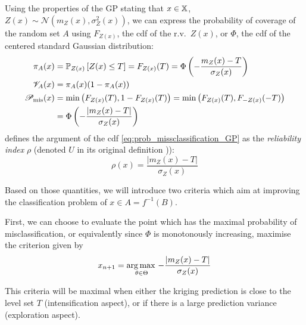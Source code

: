 \documentclass[../../Main_ManuscritThese.tex]{subfiles}
\begin{document}
Using the properties of the GP stating that $x\in\mathbb{X}$,
$Z(x)\sim\mathcal{N}\left(m_Z(x), \sigma^2_Z(x)\right)$,
we can express the probability of
coverage of the random set $A$ using $F_{Z(x)}$, the cdf of the r.v.\
$Z(x)$, or $\Phi$, the cdf of the centered standard Gaussian
distribution:
\begin{align}
  \pi_A(x) &= \mathbb{P}_{Z(x)}\left[Z(x) \leq T\right] = F_{Z(x)}(T)=\Phi\left(-\frac{m_Z(x) - T}{\sigma_Z(x)}\right) \\
  \mathscr{V}_A(x) &= \pi_A(x)(1 - \pi_A(x)) \\
  \mathscr{P}_{\mathrm{mis}}(x) &= \min\left(F_{Z(x)}(T), 1-F_{Z(x)}(T)\right)=\min\left(F_{Z(x)}(T),F_{-Z(x)}(-T)\right) \\
           &= \Phi\left(- \frac{\lvert m_Z(x) - T \rvert}{\sigma_Z(x)} \right) \label{eq:prob_missclassification_GP}
\end{align}
\cite{echard_ak-mcs_2011} defines the argument of the cdf
\cref{eq:prob_missclassification_GP} as the \emph{reliability index}
$\rho$ (denoted $U$ in its original definition
\cite{echard_ak-mcs_2011})):
\begin{equation}
  \label{eq:reliability_rho}
  \rho(x) = \frac{\lvert m_Z(x) - T \rvert}{\sigma_Z(x)}
\end{equation}

Based on those quantities, we will introduce two criteria which aim at
improving the classification problem of $x\in A=f^{-1}(B)$.

First, we can choose to evaluate the point which has the maximal
probability of misclassification, or equivalently since $\Phi$ is
monotonously increasing, maximise the criterion given by
\begin{equation} x_{n+1} =\operatorname*{arg\,max \,}_{\theta\in\Theta} -\frac{\lvert m_Z(x)- T \rvert}{\sigma_Z(x)}
\end{equation}

This criteria will be maximal when either the kriging prediction is
close to the level set $T$ (intensification aspect), or if there is a
large prediction variance (exploration aspect).
\end{document}
